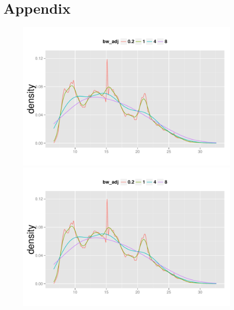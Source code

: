 \section{Appendix}

\begin{figure}
  \begin{minipage}[t]{0.33\textwidth}
    \centering
    \includegraphics[width=\textwidth,height=\textwidth]{fig/Temperature_biweight.pdf}
  \end{minipage}
  \begin{minipage}[t]{0.33\textwidth}
    \centering
    \includegraphics[width=\textwidth,height=\textwidth]{fig/Temperature_cosine.pdf}

\end{minipage}
\end{figure}
